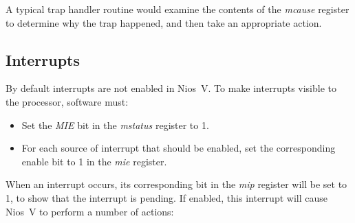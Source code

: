 \documentclass[11pt, twoside, pdftex]{article}
\begin{document}
A typical trap handler routine would examine the contents of the {\it mcause} register to
determine why the trap happened, and then take an appropriate action.

\subsection{Interrupts}
\label{sec:interrupts}

By default interrupts are not enabled in Nios~V. To make interrupts visible to the
processor, software must:
\begin{itemize}
\item Set the {\it MIE} bit in the {\it mstatus} register to 1. 
\item For each source of interrupt that should be enabled, set the corresponding enable bit 
to 1 in the {\it mie} register.
\end{itemize}
\vspace{-\baselineskip}
When an interrupt occurs, its corresponding bit in the {\it mip} register will be set to
1, to show that the interrupt is pending.
If enabled, this interrupt will cause Nios~V to perform a number of actions:
\end{document}
